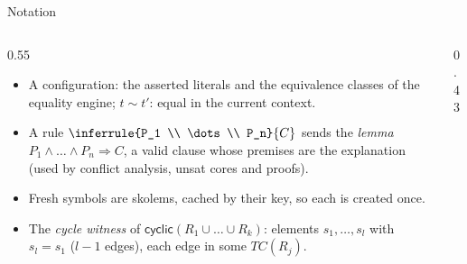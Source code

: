 \documentclass[aspectratio=169]{beamer}
\newcommand{\TC}{\mathit{TC}}
\newcommand{\cyc}[1]{\mathsf{cyclic}(#1)}
\begin{document}
\begin{frame}{Notation}
  \begin{columns}[T]
  \begin{column}{0.55\textwidth}
    \small
    \begin{itemize}
      \item A configuration: the asserted literals and the equivalence classes of the
        equality engine; $t \sim t'$: equal in the current context.
      \item A rule
        \(\inferrule{P_1 \\ \dots \\ P_n}{C}\)
        sends the \emph{lemma} $P_1\wedge\dots\wedge P_n \Rightarrow C$, a valid clause whose
        premises are the explanation (used by conflict analysis, unsat cores and proofs).
      \item Fresh symbols are skolems, cached by their key, so each is created once.
      \item The \emph{cycle witness} of $\cyc{R_1\cup\dots\cup R_k}$: elements
        $s_1,\dots,s_l$ with $s_l = s_1$ ($l-1$ edges), each edge in some $\TC(R_j)$.
    \end{itemize}
  \end{column}
  \begin{column}{0.43\textwidth}
    \centering
  \end{column}
  \end{columns}
\end{frame}
\end{document}
